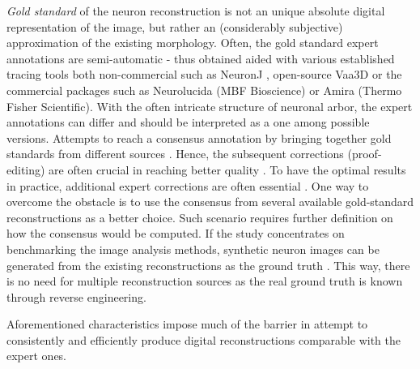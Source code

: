 \textit{Gold standard} of the neuron reconstruction is not an unique absolute digital representation of the image, but rather an (considerably subjective) approximation of the existing morphology. Often, the gold standard expert annotations are semi-automatic - thus obtained aided with various established tracing tools \cite{ascoli2007neuromorpho} both non-commercial such as NeuronJ \cite{meijering2004design}, open-source Vaa3D \cite{peng2014extensible} or the commercial packages such as Neurolucida (MBF Bioscience) or Amira (Thermo Fisher Scientific). With the often intricate structure of neuronal arbor, the expert annotations can differ and should be interpreted as a one among possible versions. Attempts to reach a consensus annotation by bringing together gold standards from different sources \cite{peng2015bigneuron}. Hence, the subsequent corrections (proof-editing) are often crucial in reaching better quality \cite{peng2011proof}. To have the optimal results in practice, additional expert corrections are often essential \cite{peng2011proof}. One way to overcome the obstacle is to use the consensus from several available gold-standard reconstructions as a better choice. Such scenario requires further definition on how the consensus would be computed. If the study concentrates on benchmarking the image analysis methods, synthetic neuron images can be generated from the existing reconstructions as the ground truth \cite{koene2009netmorph,radojevic2015fuzzy,radojevic-pnr}. This way, there is no need for multiple reconstruction sources as the real ground truth is known through reverse engineering.%

Aforementioned characteristics impose much of the barrier in attempt to consistently and efficiently produce digital reconstructions comparable with the expert ones.

